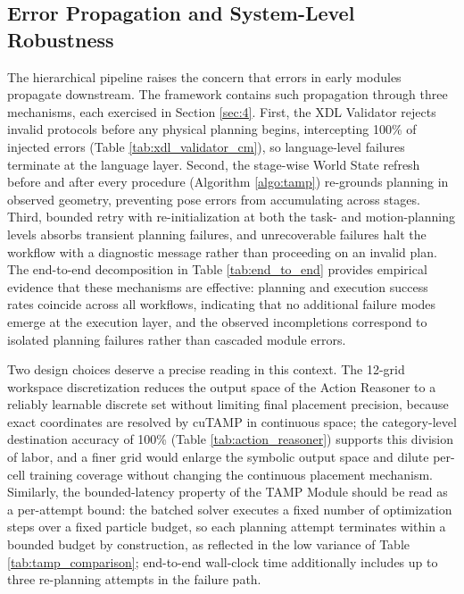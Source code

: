 \documentclass{ieeeaccess}
\begin{document}
\subsection{Error Propagation and System-Level Robustness}\label{sec:5.4}
The hierarchical pipeline raises the concern that errors in early modules propagate downstream. The framework contains such propagation through three mechanisms, each exercised in Section \ref{sec:4}. First, the XDL Validator rejects invalid protocols before any physical planning begins, intercepting 100\% of injected errors (Table \ref{tab:xdl_validator_cm}), so language-level failures terminate at the language layer. Second, the stage-wise World State refresh before and after every procedure (Algorithm \ref{algo:tamp}) re-grounds planning in observed geometry, preventing pose errors from accumulating across stages. Third, bounded retry with re-initialization at both the task- and motion-planning levels absorbs transient planning failures, and unrecoverable failures halt the workflow with a diagnostic message rather than proceeding on an invalid plan. The end-to-end decomposition in Table \ref{tab:end_to_end} provides empirical evidence that these mechanisms are effective: planning and execution success rates coincide across all workflows, indicating that no additional failure modes emerge at the execution layer, and the observed incompletions correspond to isolated planning failures rather than cascaded module errors.

Two design choices deserve a precise reading in this context. The 12-grid workspace discretization reduces the output space of the Action Reasoner to a reliably learnable discrete set without limiting final placement precision, because exact coordinates are resolved by cuTAMP in continuous space; the category-level destination accuracy of 100\% (Table \ref{tab:action_reasoner}) supports this division of labor, and a finer grid would enlarge the symbolic output space and dilute per-cell training coverage without changing the continuous placement mechanism. Similarly, the bounded-latency property of the TAMP Module should be read as a per-attempt bound: the batched solver executes a fixed number of optimization steps over a fixed particle budget, so each planning attempt terminates within a bounded budget by construction, as reflected in the low variance of Table \ref{tab:tamp_comparison}; end-to-end wall-clock time additionally includes up to three re-planning attempts in the failure path.
\end{document}
